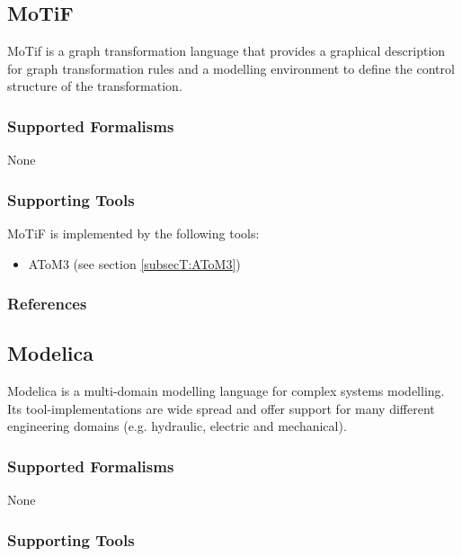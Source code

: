 \subsection{MoTiF}
\label{subsecL:MoTiF}

MoTif is a graph transformation language that provides a graphical description for graph transformation rules and a modelling environment to define the control structure of the transformation.

\subsubsection{Supported Formalisms}

None


\subsubsection{Supporting Tools}

MoTiF is implemented by the following tools:
\begin{itemize}
	\item AToM3 (see section \ref{subsecT:AToM3})
\end{itemize}


\subsubsection{References}





\subsection{Modelica}
\label{subsecL:Modelica}


Modelica is a multi-domain modelling language for complex systems modelling. 
Its tool-implementations are wide spread and offer support for many different engineering domains (e.g. hydraulic, electric and mechanical).

\subsubsection{Supported Formalisms}

None


\subsubsection{Supporting Tools}

